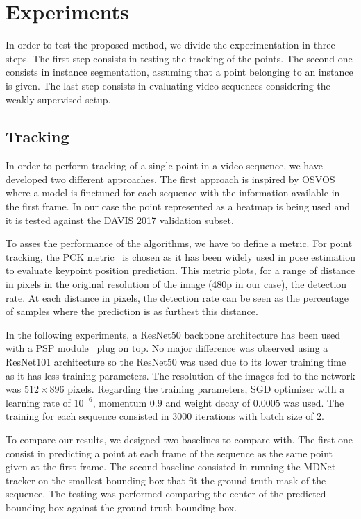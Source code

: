 
\section{Experiments}

In order to test the proposed method, we divide the experimentation in three steps.
The first step consists in testing the tracking of the points.
The second one consists in instance segmentation, assuming that a point belonging to an instance is given.
The last step consists in evaluating video sequences considering the weakly-supervised setup.

\subsection{Tracking}

In order to perform tracking of a single point in a video sequence, we have developed two different approaches.
The first approach is inspired by OSVOS~\osvos{} where a model is finetuned for each sequence with the information available in the first frame.
In our case the point represented as a heatmap is being used and it is tested against the DAVIS 2017 validation subset.

To asses the performance of the algorithms, we have to define a metric.
For point tracking, the PCK metric~\pckmetric{} is chosen as it has been widely used in pose estimation to evaluate keypoint position prediction.
This metric plots, for a range of distance in pixels in the original resolution of the image (480p in our case), the detection rate.
At each distance in pixels, the detection rate can be seen as the percentage of samples where the prediction is as furthest this distance. %

In the following experiments, a ResNet50 backbone architecture has been used with a PSP module~\pspnet{} plug on top.
No major difference was observed using a ResNet101 architecture so the ResNet50 was used due to its lower training time as it has less training parameters.
The resolution of the images fed to the network was $512 \times 896$ pixels.
Regarding the training parameters, SGD optimizer with a learning rate of $10^{-6}$, momentum $0.9$ and weight decay of $0.0005$ was used. The training for each sequence consisted in 3000 iterations with batch size of $2$.

To compare our results, we designed two baselines to compare with.
The first one consist in predicting a point at each frame of the sequence as the same point given at the first frame.
The second baseline consisted in running the MDNet~\mdnet{} tracker on the smallest bounding box that fit the ground truth mask of the sequence.
The testing was performed comparing the center of the predicted bounding box against the ground truth bounding box.

